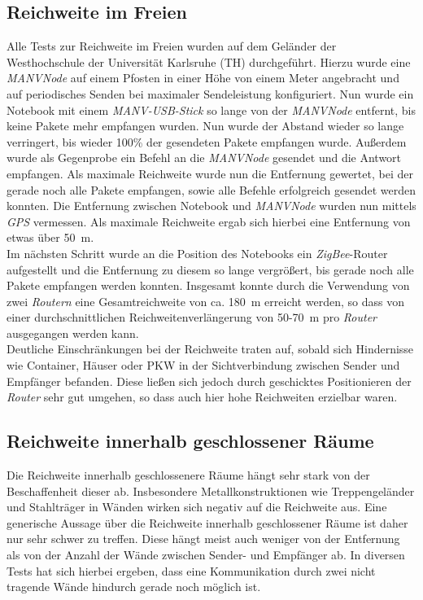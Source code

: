 \subsection{Reichweite im Freien}
Alle Tests zur Reichweite im Freien wurden auf dem Geländer der Westhochschule der Universität Karlsruhe (TH)
durchgeführt. Hierzu wurde eine \emph{MANVNode} auf einem Pfosten in einer Höhe von einem Meter angebracht
und auf periodisches Senden bei maximaler Sendeleistung konfiguriert.  Nun wurde ein Notebook mit einem 
\emph{MANV-USB-Stick} so lange von der \emph{MANVNode} entfernt, bis keine Pakete mehr empfangen wurden.
Nun wurde der Abstand wieder so lange verringert, bis wieder 100\% der gesendeten Pakete empfangen wurde.
Außerdem wurde als Gegenprobe ein Befehl an die \emph{MANVNode} gesendet und die Antwort empfangen. 
Als maximale Reichweite wurde nun die Entfernung gewertet, bei der gerade noch alle Pakete empfangen, 
sowie alle Befehle erfolgreich gesendet werden konnten. Die Entfernung zwischen Notebook und 
\emph{MANVNode} wurden nun mittels \emph{GPS} vermessen. Als maximale Reichweite ergab sich hierbei eine Entfernung
von etwas über 50~m.\\
Im nächsten Schritt wurde an die Position des Notebooks ein \emph{ZigBee}-Router aufgestellt und die Entfernung zu
diesem so lange vergrößert, bis gerade noch alle Pakete empfangen werden konnten. Insgesamt konnte durch
die Verwendung von zwei \emph{Routern} eine Gesamtreichweite von ca. 180~m erreicht werden, so dass von einer 
durchschnittlichen Reichweitenverlängerung von 50-70~m pro \emph{Router} ausgegangen werden kann.\\
Deutliche Einschränkungen bei der Reichweite traten auf, sobald sich Hindernisse wie Container, Häuser oder 
PKW in der Sichtverbindung zwischen Sender und Empfänger befanden. Diese ließen sich jedoch durch geschicktes
Positionieren der \emph{Router} sehr gut umgehen, so dass auch hier hohe Reichweiten erzielbar waren. 

\subsection{Reichweite innerhalb geschlossener Räume}
Die Reichweite innerhalb geschlossenere Räume hängt sehr stark von der Beschaffenheit dieser ab. Insbesondere
Metallkonstruktionen wie Treppengeländer und Stahlträger in Wänden wirken sich negativ auf die
Reichweite aus. Eine generische Aussage über die Reichweite innerhalb geschlossener Räume ist daher nur 
sehr schwer zu treffen. Diese hängt meist auch weniger von der Entfernung als von der Anzahl der
Wände zwischen Sender- und Empfänger ab. In diversen Tests hat sich hierbei ergeben, dass eine
Kommunikation durch zwei nicht tragende Wände hindurch gerade noch möglich ist.
